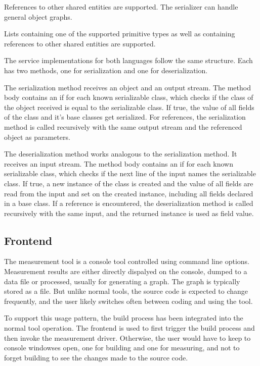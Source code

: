 \documentclass[a4paper,12pt]{article}
\begin{document}
References to other shared entities are supported. The serializer can handle
general object graphs.

Lists containing one of the supported primitive types as well as containing
references to other shared entities are supported.

The service implementations for both languages follow the same structure. Each
has two methods, one for serialization and one for deserialization. 

The serialization method receives an object and an output stream. The  method
body contains an if for each known serializable class, which checks if the class
of the object received is equal to the serializable class. If true, the value of
all fields of the class and it's base classes get serialized. For references,
the  serialization method is called recursively with the same output stream and
the  referenced object as parameters.

The deserialization method works analogous to the serialization method. It
receives an input stream. The method body contains an if for each known
serializable class, which checks if the next line of the input names  the
serializable class. If true, a new instance of the class is created and the
value of all fields are read from the input and set on the created instance,
including all fields declared in a base class. If a reference is encountered,
the deserialization method is called recursively with the same input, and the
returned instance is used as field value.

\subsection{Frontend}
The measurement tool is a console tool controlled using command line options.
Measurement results are either directly dispalyed on the console, dumped to a
data file or processed, usually for generating a graph. The graph is typically
stored as a file. But unlike normal tools, the source code is expected to change
frequently, and the user likely switches often between coding and using the
tool.

To support this usage pattern, the build process has been integrated into the
normal tool operation. The frontend is used to first trigger the build process
and then invoke the measurement driver. Otherwise, the user would have to keep
to console windowses open, one for building and one for measuring, and not to
forget building to see the changes made to the source code.
\end{document}
